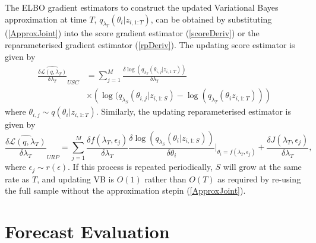 \documentclass[12pt,a4paper]{article}\usepackage[]{graphicx}\usepackage[]{color}
\begin{document}
The ELBO gradient estimators to construct the updated Variational Bayes approximation at time $T$,  $q_{\lambda_T}(\theta_{i} | z_{i, 1:T})$, can be obtained by substituting (\ref{ApproxJoint}) into the score gradient estimator (\ref{scoreDeriv}) or the reparameterised gradient estimator (\ref{rpDeriv}). The updating score estimator is given by
\begin{align}
\widehat{\frac{\delta\mathcal{L}(q, \lambda_T)}{\delta \lambda_T}}_{USC} &= \sum_{j = 1}^M \frac{\delta \log(q_{\lambda_T}(\theta_{i, j} | z_{i, 1:T}))}{\delta \lambda_T} \nonumber \\
&\times \left(\log(q_{\lambda_S}(\theta_{i, j} | z_{i, 1:S}) - \log(q_{\lambda_T}(\theta_{i} z_{i, 1:T})) \right) \label{scoreUpdate}
\end{align}
where $\theta_{i, j} \sim q(\theta_{i} | z_{i, 1:T})$. Similarly, the updating reparameterised estimator is given by
\begin{equation}
\label{rpUpdate}
\widehat{\frac{\delta\mathcal{L}(q, \lambda_T)}{\delta \lambda_T}}_{URP} = \sum_{j = 1}^M \frac{\delta f(\lambda_T, \epsilon_j)}{\delta \lambda_T} \frac{\delta \log(q_{\lambda_S}(\theta_{i} |z_{i, 1:S}))}{\delta \theta_{i}} \bigg\rvert_{\theta_{i} = f(\lambda_T, \epsilon_j)} + \frac{\delta J(\lambda_T, \epsilon_j)}{\delta \lambda_T},
\end{equation}
where $\epsilon_j \sim r(\epsilon)$. If this process is repeated periodically, $S$ will grow at the same rate as $T$, and updating VB is $O(1)$ rather than $O(T)$ as required by re-using the full sample without the approximation stepin (\ref{ApproxJoint}).

\section{Forecast Evaluation}
\label{sec:eval}
\end{document}
